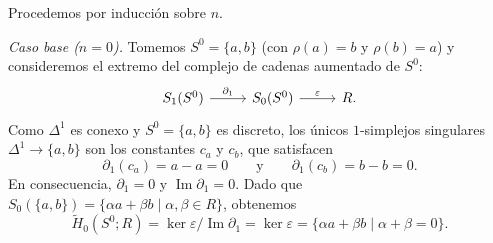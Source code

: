 \begin{dem}
Procedemos por inducción sobre $n$.

\smallskip
\noindent\textit{Caso base ($n = 0$).} Tomemos $S^0 = \{a, b\}$ (con $\rho(a) = b$ y $\rho(b) = a$) y consideremos el extremo del complejo de cadenas aumentado de $S^0$:
\[
\begin{tikzcd}[column sep=2.6em]
S_1(S^0) \arrow[r, "\partial_1"] & S_0(S^0) \arrow[r, "\varepsilon"] & R.
\end{tikzcd}
\]
Como $\Delta^1$ es conexo y $S^0 = \{a, b\}$ es discreto, los únicos $1$-simplejos singulares $\Delta^1 \to \{a, b\}$ son los constantes $c_a$ y $c_b$, que satisfacen
\[
\partial_1(c_a) = a - a = 0
\qquad \text{y} \qquad
\partial_1(c_b) = b - b = 0.
\]
En consecuencia, $\partial_1 = 0$ y $\operatorname{Im}\partial_1 = 0$. Dado que $S_0(\{a, b\}) = \{\alpha a + \beta b \mid \alpha, \beta \in R\}$, obtenemos
\[
\widetilde{H}_0(S^0; R) = \ker\varepsilon / \operatorname{Im}\partial_1 = \ker\varepsilon = \{\alpha a + \beta b \mid \alpha + \beta = 0\}.
\]


\end{dem}
